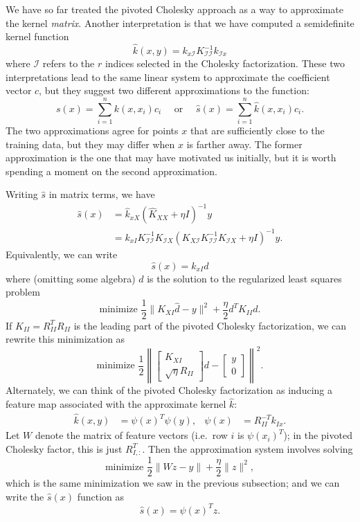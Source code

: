 \documentclass[12pt, leqno]{article} %
\newcommand{\calI}{\mathcal{I}}
\begin{document}
We have so far treated the pivoted Cholesky approach as a way to
approximate the kernel {\em matrix}.  Another interpretation is that
we have computed a semidefinite kernel function
\[
  \hat{k}(x,y) = k_{x\calI} K_{\calI \calI}^{-1} k_{\calI x}
\]
where $\calI$ refers to the $r$ indices selected in the Cholesky
factorization.  These two interpretations lead to the same linear
system to approximate the coefficient vector $c$, but they suggest
two different approximations to the function:
\[
  s(x) = \sum_{i=1}^n k(x, x_i) c_i
  \quad \mbox{ or } \quad
  \hat{s}(x) = \sum_{i=1}^n \hat{k}(x, x_i) c_i.
\]
The two approximations agree for points $x$ that are sufficiently
close to the training data, but they may differ when $x$ is farther
away.   The former approximation is the one that may have motivated us
initially, but it is worth spending a moment on the second approximation.

Writing $\hat{s}$ in matrix terms, we have
\begin{align*}
  \hat{s}(x)
  &= \hat{k}_{xX} (\hat{K}_{XX} + \eta I)^{-1} y \\
  &= k_{xI} K_{\calI \calI}^{-1} K_{\calI X}
     ( K_{X \calI} K_{\calI \calI}^{-1} K_{\calI X} + \eta I)^{-1} y.
\end{align*}
Equivalently, we can write
\[
  \hat{s}(x) = k_{xI} d
\]
where (omitting some algebra) $d$ is the solution to the regularized
least squares problem
\[
  \mbox{minimize }
  \frac{1}{2} \|K_{XI} \hat{d}-y\|^2 + \frac{\eta}{2} d^T K_{II} d.
\]
If $K_{II} = R_{II}^T R_{II}$ is the leading part of the pivoted
Cholesky factorization, we can rewrite this minimization as
\[
  \mbox{minimize }
  \frac{1}{2} \left\|
    \begin{bmatrix} K_{XI} \\ \sqrt{\eta} R_{II} \end{bmatrix} d -
    \begin{bmatrix} y \\ 0 \end{bmatrix}
  \right\|^2.
\]
Alternately, we can think of the pivoted Cholesky factorization as
inducing a feature map associated with the approximate kernel
$\hat{k}$:
\begin{align*}
  \hat{k}(x,y) &= \psi(x)^T \psi(y), &
  \psi(x) &= R_{II}^{-T} k_{Ix}.
\end{align*}
Let $W$ denote the matrix of feature vectors (i.e.~row $i$ is
$\psi(x_i)^T$); in the pivoted Cholesky factor, this is just
$R_{I,:}^T$.  Then the approximation system involves solving
\[
  \mbox{minimize }
  \frac{1}{2} \| W z - y \| + \frac{\eta}{2} \|z\|^2,
\]
which is the same minimization we saw in the previous subsection;
and we can write the $\hat{s}(x)$ function as
\[
  \hat{s}(x) = \psi(x)^T z.
\]
\end{document}
